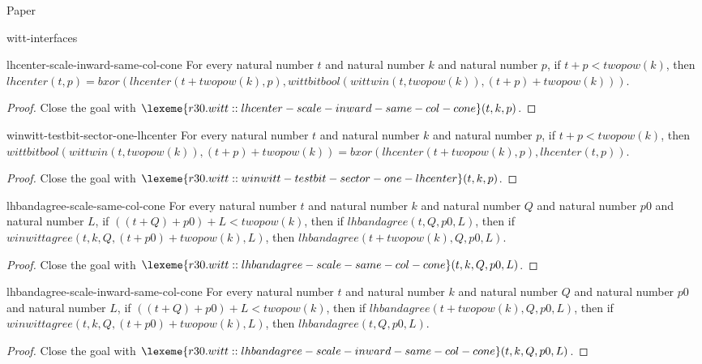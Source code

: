 \begin{lexlean}{Paper}
\begin{section}{witt-interfaces}
  \begin{theorem}{lhcenter-scale-inward-same-col-cone}
  For every natural number \(t\) and natural number \(k\) and natural number \(p\), if \(t + p < twopow(k)\), then \(lhcenter(t, p) = bxor(lhcenter(t + twopow(k), p), wittbitbool(wittwin(t, twopow(k)), (t + p) + twopow(k)))\).
  \begin{proof}
  Close the goal with \(\lexeme{r30.witt::lhcenter-scale-inward-same-col-cone}(t, k, p)\).
  \end{proof}
  \end{theorem}

  \begin{theorem}{winwitt-testbit-sector-one-lhcenter}
  For every natural number \(t\) and natural number \(k\) and natural number \(p\), if \(t + p < twopow(k)\), then \(wittbitbool(wittwin(t, twopow(k)), (t + p) + twopow(k)) = bxor(lhcenter(t + twopow(k), p), lhcenter(t, p))\).
  \begin{proof}
  Close the goal with \(\lexeme{r30.witt::winwitt-testbit-sector-one-lhcenter}(t, k, p)\).
  \end{proof}
  \end{theorem}

  \begin{theorem}{lhbandagree-scale-same-col-cone}
  For every natural number \(t\) and natural number \(k\) and natural number \(Q\) and natural number \(p0\) and natural number \(L\), if \(((t + Q) + p0) + L < twopow(k)\), then if \(lhbandagree(t, Q, p0, L)\), then if \(winwittagree(t, k, Q, (t + p0) + twopow(k), L)\), then \(lhbandagree(t + twopow(k), Q, p0, L)\).
  \begin{proof}
  Close the goal with \(\lexeme{r30.witt::lhbandagree-scale-same-col-cone}(t, k, Q, p0, L)\).
  \end{proof}
  \end{theorem}

  \begin{theorem}{lhbandagree-scale-inward-same-col-cone}
  For every natural number \(t\) and natural number \(k\) and natural number \(Q\) and natural number \(p0\) and natural number \(L\), if \(((t + Q) + p0) + L < twopow(k)\), then if \(lhbandagree(t + twopow(k), Q, p0, L)\), then if \(winwittagree(t, k, Q, (t + p0) + twopow(k), L)\), then \(lhbandagree(t, Q, p0, L)\).
  \begin{proof}
  Close the goal with \(\lexeme{r30.witt::lhbandagree-scale-inward-same-col-cone}(t, k, Q, p0, L)\).
  \end{proof}
  \end{theorem}


\end{section}
\end{lexlean}
